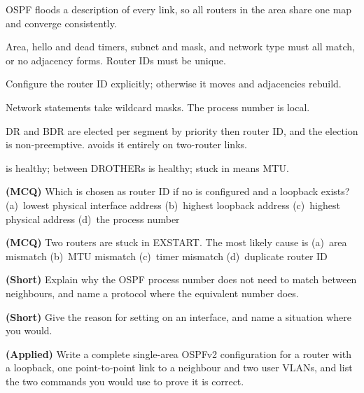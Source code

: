 \begin{chaptersummary}
\begin{tight}
  \item OSPF floods a description of every link, so all routers in the area share
        one map and converge consistently.
  \item Area, hello and dead timers, subnet and mask, and network type must all
        match, or no adjacency forms. Router IDs must be unique.
  \item Configure the router ID explicitly; otherwise it moves and adjacencies
        rebuild.
  \item Network statements take wildcard masks. The process number is local.
  \item DR and BDR are elected per segment by priority then router ID, and the
        election is non-preemptive.  avoids
        it entirely on two-router links.
  \item {} is healthy;  between DROTHERs is healthy; stuck in
         means MTU.
\end{tight}
\end{chaptersummary}

\begin{reviewq}
  \item \textbf{(MCQ)} Which is chosen as router ID if no  is
        configured and a loopback exists?
        (a)~lowest physical interface address (b)~highest loopback address
        (c)~highest physical address (d)~the process number
  \item \textbf{(MCQ)} Two routers are stuck in EXSTART. The most likely cause is
        (a)~area mismatch (b)~MTU mismatch (c)~timer mismatch (d)~duplicate router
        ID
  \item \textbf{(Short)} Explain why the OSPF process number does not need to
        match between neighbours, and name a protocol where the equivalent number
        does.
  \item \textbf{(Short)} Give the reason for setting  on
        an interface, and name a situation where you would.
  \item \textbf{(Applied)} Write a complete single-area OSPFv2 configuration for a
        router with a loopback, one point-to-point link to a neighbour and two
        user VLANs, and list the two  commands you would use to prove it
        is correct.
\end{reviewq}
